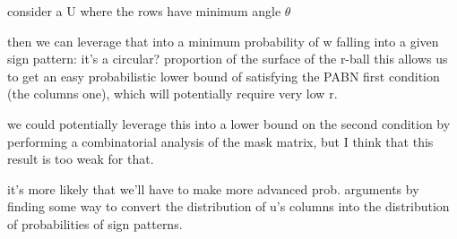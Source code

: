 \documentclass[12pt]{article}
\begin{document}
consider a U where the rows have minimum angle $\theta$

then we can leverage that into a minimum probability of w falling into a given sign pattern: it's a circular? proportion of the surface of the r-ball
this allows us to get an easy probabilistic lower bound of satisfying the PABN first condition (the columns one), which will potentially require very low r.

we could potentially leverage this into a lower bound on the second condition by performing a combinatorial analysis of the mask matrix, but I think that this result is too weak for that.

it's more likely that we'll have to make more advanced prob. arguments by finding some way to convert the distribution of u's columns into the distribution of probabilities of sign patterns.
\end{document}
